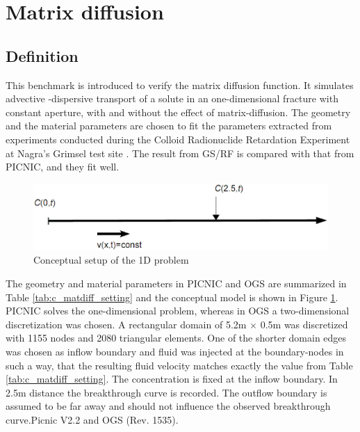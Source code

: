 \section{Matrix diffusion}

\subsection{Definition}

This benchmark is introduced to verify the matrix diffusion function. It simulates
advective -dispersive transport of a solute in an one-dimensional
fracture with constant aperture, with and without the effect of
matrix-diffusion. The geometry and the material parameters are
chosen to fit the parameters extracted from experiments conducted
during the Colloid Radionuclide Retardation Experiment at Nagra's
Grimsel test site \cite{KosaSmith:2005}. The result from GS/RF is
compared with that from PICNIC, and they fit well.

\begin{figure}[!htb]
  \begin{center}
    \includegraphics[scale=0.25]{PART_II/C/fig_matdiff_domain.eps}
  \end{center}
  \caption{Conceptual setup of the 1D problem}
  \label{c:matdiff_dom}
\end{figure}

The geometry and material parameters in PICNIC and OGS are
summarized in Table \ref{tab:c_matdiff_setting} and the conceptual
model is shown in Figure \ref{c:matdiff_dom}. PICNIC solves the
one-dimensional problem, whereas in OGS a two-dimensional
discretization was chosen. A rectangular domain of 5.2m $\times$
0.5m was discretized with 1155 nodes and 2080 triangular elements.
One of the shorter domain edges was chosen as inflow boundary and
fluid was injected at the boundary-nodes in such a way, that the
resulting fluid velocity matches exactly the value from Table
\ref{tab:c_matdiff_setting}. The concentration is fixed at the
inflow boundary. In 2.5m distance the breakthrough curve is
recorded. The outflow boundary is assumed to be far away and should
not influence the observed breakthrough curve.Picnic V2.2 and OGS (Rev. 1535).

